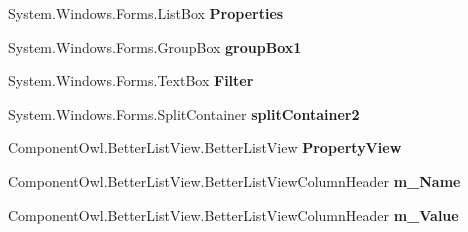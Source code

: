 \begin{DoxyCompactItemize}
\item 
\hypertarget{classlib_watcher_dialog_1_1_property_form_3_01_t_00_01_t2_01_4_a4652fe05b0c2b77c4d4753212a0c83d3}{System.\+Windows.\+Forms.\+List\+Box {\bfseries Properties}}\label{classlib_watcher_dialog_1_1_property_form_3_01_t_00_01_t2_01_4_a4652fe05b0c2b77c4d4753212a0c83d3}

\item 
\hypertarget{classlib_watcher_dialog_1_1_property_form_3_01_t_00_01_t2_01_4_a40a5f303d454c726fe3f517561477859}{System.\+Windows.\+Forms.\+Group\+Box {\bfseries group\+Box1}}\label{classlib_watcher_dialog_1_1_property_form_3_01_t_00_01_t2_01_4_a40a5f303d454c726fe3f517561477859}

\item 
\hypertarget{classlib_watcher_dialog_1_1_property_form_3_01_t_00_01_t2_01_4_ab208e59a4fcaad2ca20ebfc68dbd074f}{System.\+Windows.\+Forms.\+Text\+Box {\bfseries Filter}}\label{classlib_watcher_dialog_1_1_property_form_3_01_t_00_01_t2_01_4_ab208e59a4fcaad2ca20ebfc68dbd074f}

\item 
\hypertarget{classlib_watcher_dialog_1_1_property_form_3_01_t_00_01_t2_01_4_a8a3a10fa87f128ba6f8a9e71bd9028b7}{System.\+Windows.\+Forms.\+Split\+Container {\bfseries split\+Container2}}\label{classlib_watcher_dialog_1_1_property_form_3_01_t_00_01_t2_01_4_a8a3a10fa87f128ba6f8a9e71bd9028b7}

\item 
\hypertarget{classlib_watcher_dialog_1_1_property_form_3_01_t_00_01_t2_01_4_af71c4f6ac25f0b01e64e2ff1009ce9b9}{Component\+Owl.\+Better\+List\+View.\+Better\+List\+View {\bfseries Property\+View}}\label{classlib_watcher_dialog_1_1_property_form_3_01_t_00_01_t2_01_4_af71c4f6ac25f0b01e64e2ff1009ce9b9}

\item 
\hypertarget{classlib_watcher_dialog_1_1_property_form_3_01_t_00_01_t2_01_4_a1e2a6a343e0c98879d34575cfc2e7066}{Component\+Owl.\+Better\+List\+View.\+Better\+List\+View\+Column\+Header {\bfseries m\+\_\+\+Name}}\label{classlib_watcher_dialog_1_1_property_form_3_01_t_00_01_t2_01_4_a1e2a6a343e0c98879d34575cfc2e7066}

\item 
\hypertarget{classlib_watcher_dialog_1_1_property_form_3_01_t_00_01_t2_01_4_aac320f7bb6b07ec48f28474000d3e47c}{Component\+Owl.\+Better\+List\+View.\+Better\+List\+View\+Column\+Header {\bfseries m\+\_\+\+Value}}\label{classlib_watcher_dialog_1_1_property_form_3_01_t_00_01_t2_01_4_aac320f7bb6b07ec48f28474000d3e47c}


\end{DoxyCompactItemize}
